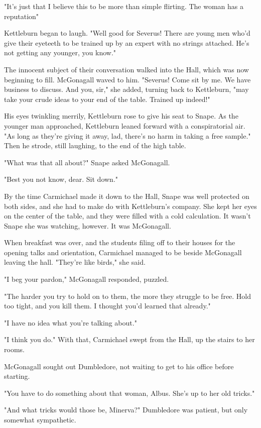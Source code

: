 "It's just that I believe this to be more than simple flirting. The woman has a reputation{\el}"

Kettleburn began to laugh. "Well good for Severus! There are young men who'd give their eyeteeth to be trained up by an expert with no strings attached. He's not getting any younger, you know."

The innocent subject of their conversation walked into the Hall, which was now beginning to fill. McGonagall waved to him. "Severus! Come sit by me. We have business to discuss. And you, sir," she added, turning back to Kettleburn, "may take your crude ideas to your end of the table. Trained up indeed!"

His eyes twinkling merrily, Kettleburn rose to give his seat to Snape. As the younger man approached, Kettleburn leaned forward with a conspiratorial air. "As long as they're giving it away, lad, there's no harm in taking a free sample." Then he strode, still laughing, to the end of the high table.

"What was that all about?" Snape asked McGonagall.

"Best you not know, dear. Sit down."

By the time Carmichael made it down to the Hall, Snape was well protected on both sides, and she had to make do with Kettleburn's company. She kept her eyes on the center of the table, and they were filled with a cold calculation. It wasn't Snape she was watching, however. It was McGonagall.

When breakfast was over, and the students filing off to their houses for the opening talks and orientation, Carmichael managed to be beside McGonagall leaving the hall. "They're like birds," she said.

"I beg your pardon," McGonagall responded, puzzled.

"The harder you try to hold on to them, the more they struggle to be free. Hold too tight, and you kill them. I thought you'd learned that already."

"I have no idea what you're talking about."

"I think you do." With that, Carmichael swept from the Hall, up the stairs to her rooms.

McGonagall sought out Dumbledore, not waiting to get to his office before starting.

"You have to do something about that woman, Albus. She's up to her old tricks."

"And what tricks would those be, Minerva?" Dumbledore was patient, but only somewhat sympathetic.


